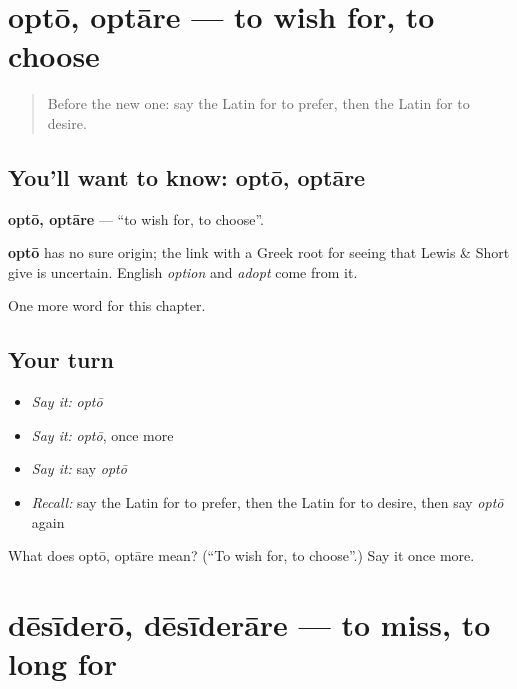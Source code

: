 \section[optō, optāre]{optō, optāre — to wish for, to choose}

\label{lesson:LA-C111-opto}



\begin{quote}
Before the new one: say the Latin for to prefer, then the Latin for to desire.
\end{quote}

\subsection*{You'll want to know: optō, optāre}
\textbf{optō, optāre} — \textquotedblleft{}to wish for, to choose\textquotedblright{}.

\begin{cousinweb}
\textbf{optō} has no sure origin; the link with a Greek root for seeing that Lewis \& Short give is uncertain. English \emph{option} and \emph{adopt} come from it.
\end{cousinweb}

\begin{grammarlens}[title={What you've built}]
One more word for this chapter.
\end{grammarlens}

\subsection*{Your turn}
\begin{itemize}
\raggedright
  \item \emph{Say it:} \emph{optō}
  \item \emph{Say it:} \emph{optō}, once more
  \item \emph{Say it:} say \emph{optō}
  \item \emph{Recall:} say the Latin for to prefer, then the Latin for to desire, then say \emph{optō} again
\end{itemize}

\begin{tcolorbox}[breakable,colback=teal!4,colframe=teal!35!black,title={Before you move on}]
What does optō, optāre mean? (\textquotedblleft{}To wish for, to choose\textquotedblright{}.) Say it once more.
\end{tcolorbox}
\section[dēsīderō, dēsīderāre]{dēsīderō, dēsīderāre — to miss, to long for}

